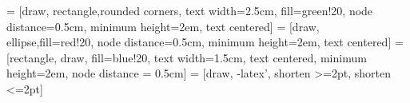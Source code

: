 \date{}

\renewenvironment{Shaded}{\begin{snugshade}}{\end{snugshade}}

\newcommand{\aparte}[2]{
	{\small\textsf{\textbf{#1} #2}}
}


\usepackage{tikz}
\usetikzlibrary{shapes,arrows,calc, positioning}
 = [draw, rectangle,rounded corners, text width=2.5cm, fill=green!20, node distance=0.5cm, minimum height=2em, text centered]
 = [draw, ellipse,fill=red!20, node distance=0.5cm, minimum height=2em, text centered]
 = [rectangle, draw, fill=blue!20, 
    text width=1.5cm, text centered, minimum height=2em, node distance = 0.5cm]
 = [draw, -latex', shorten >=2pt, shorten <=2pt]


\newcommand{\strong}[1]{%
  \textbf{\textcolor{redInsee}{#1}}%
}
